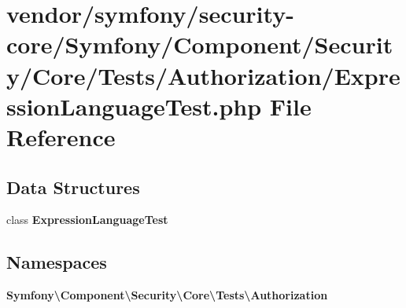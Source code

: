 \section{vendor/symfony/security-\/core/\+Symfony/\+Component/\+Security/\+Core/\+Tests/\+Authorization/\+Expression\+Language\+Test.php File Reference}
\label{_expression_language_test_8php}
\subsection*{Data Structures}
\begin{DoxyCompactItemize}
\item 
class {\bf Expression\+Language\+Test}
\end{DoxyCompactItemize}
\subsection*{Namespaces}
\begin{DoxyCompactItemize}
\item 
 {\bf Symfony\textbackslash{}\+Component\textbackslash{}\+Security\textbackslash{}\+Core\textbackslash{}\+Tests\textbackslash{}\+Authorization}
\end{DoxyCompactItemize}
